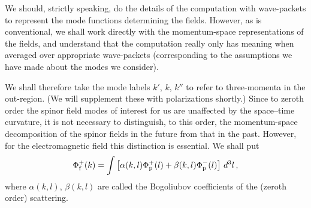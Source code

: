 \documentclass[12pt]{article}
\begin{document}
We should, strictly speaking, do the details of the computation with
wave-packets to represent the mode functions determining the fields.  However,
as is conventional, we shall work directly with the momentum-space
representations of the fields, and understand that the computation really only
has meaning when averaged over appropriate wave-packets (corresponding to the
assumptions we have made about the modes we consider).


We shall therefore take the mode labels $k'$, $k$, $k''$ to refer to
three-momenta in the out-region.  (We will supplement these with polarizations
shortly.) 
Since to zeroth order the spinor field modes of interest for us are unaffected
by the space--time curvature, it is not necessary to distinguish, to this
order, the momentum-space decomposition of the spinor fields in the future from
that in the past.  However, for the electromagnetic field this distinction is
essential.  We shall put
\begin{equation}
\Phi ^+_{\rm f}(k)=\int \left[ \alpha (k,l)\Phi ^+_{\rm p}(l) +\beta (k,l)\Phi
^-_{\rm p}(l)\right]\, d^3l\, ,
\end{equation}
where $\alpha (k,l)$, $\beta (k,l)$ are called the Bogoliubov coefficients of 
the (zeroth order) scattering.  
\end{document}
